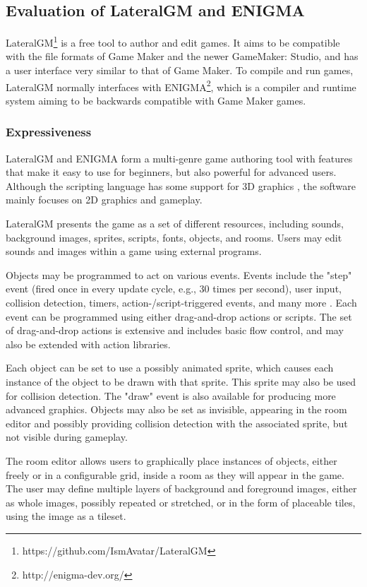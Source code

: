 \subsection{Evaluation of LateralGM and ENIGMA}

LateralGM\footnote{https://github.com/IsmAvatar/LateralGM} is a free tool to 
author and edit games. It aims to be compatible with the file formats of Game 
Maker and the newer GameMaker: Studio, and has a user interface very similar 
to that of Game Maker. To compile and run games, LateralGM normally interfaces 
with ENIGMA\footnote{http://enigma-dev.org/}, which is a compiler and runtime 
system aiming to be backwards compatible with Game Maker games.

\subsubsection{Expressiveness}
LateralGM and ENIGMA form a multi-genre game authoring tool with features that 
make it easy to use for beginners, but also powerful for advanced users. 
Although the scripting language has some support for 3D graphics 
\cite{enigma3d}, the software mainly focuses on 2D graphics and gameplay.

LateralGM presents the game as a set of different resources, including sounds, 
background images, sprites, scripts, fonts, objects, and rooms. Users may edit 
sounds and images within a game using external programs.

Objects may be programmed to act on various events. Events include the "step" 
event (fired once in every update cycle, e.g., 30 times per second), user 
input, collision detection, timers, action-/script-triggered events, and many 
more \cite{lgmevents}. Each event can be programmed using either drag-and-drop 
actions or scripts. The set of drag-and-drop actions is extensive and includes 
basic flow control, and may also be extended with action libraries.

Each object can be set to use a possibly animated sprite, which causes each 
instance of the object to be drawn with that sprite. This sprite may also be 
used for collision detection. The "draw" event is also available for producing 
more advanced graphics. Objects may also be set as invisible, appearing in the 
room editor and possibly providing collision detection with the associated 
sprite, but not visible during gameplay.

The room editor allows users to graphically place instances of objects, either 
freely or in a configurable grid, inside a room as they will appear in the 
game. The user may define multiple layers of background and foreground images, 
either as whole images, possibly repeated or stretched, or in the form of 
placeable tiles, using the image as a tileset.

